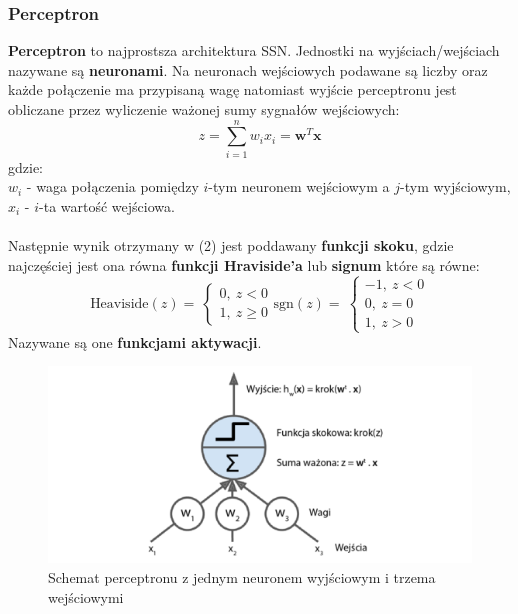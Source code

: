 \documentclass{article}
\renewcommand{\vec}[1]{\mathbf{#1}}
\begin{document}
\subsubsection{Perceptron}
\textbf{Perceptron} to  najprostsza architektura SSN. Jednostki na wyjściach/wejściach
nazywane są \textbf{neuronami}. Na neuronach wejściowych  podawane są liczby oraz
każde połączenie ma przypisaną  wagę natomiast wyjście perceptronu jest obliczane przez 
wyliczenie ważonej sumy sygnałów wejściowych:
\begin{equation}
	z = \sum_{i=1}^n w_ix_i = \vec{w}^T\vec{x}
\end{equation}
gdzie:\\
$w_i$ - waga połączenia pomiędzy $i$-tym neuronem wejściowym a $j$-tym wyjściowym,\\
$x_i$ - $i$-ta wartość wejściowa.\\ \\
Następnie wynik otrzymany w (2) jest poddawany \textbf{funkcji skoku}, gdzie najczęściej jest 
ona równa \textbf{funkcji Hraviside'a} lub \textbf{signum} które są równe:
\[
	\text{Heaviside}(z) = \
	\begin{cases}
		0, \: z < 0 \\
		1, \: z \geq 0
	\end{cases} 
	\text{sgn}(z) = \
	\begin{cases}
		-1, \: z < 0 \\
		0, \: z = 0 \\
		1, \: z > 0
	\end{cases} 
\]
Nazywane są one \textbf{funkcjami aktywacji}.\\

\begin{figure}[H]
\centering
\includegraphics[scale=0.5]{perceptron.png}
\caption{Schemat perceptronu z jednym neuronem wyjściowym i trzema wejściowymi \cite{um}}
\end{figure}
\end{document}
